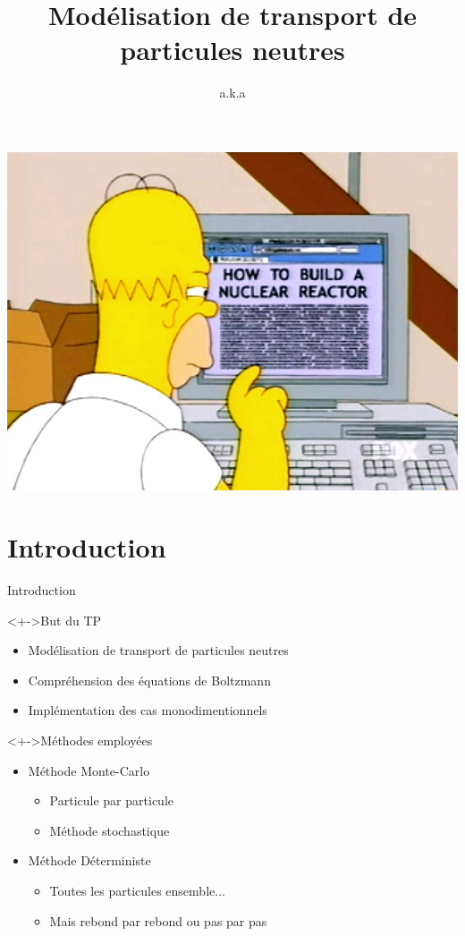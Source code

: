 \documentclass[17pt]{beamer}
\title[Modélisation transport]{Modélisation de transport de particules neutres}
\author[Sohet \& Valade]{a.k.a}
\date{}
\newenvironment{blockitemize}[1]{
  \begin{block}<+->{#1}
    \begin{itemize}
    }{
    \end{itemize}
  \end{block}
}
\begin{document}
\begin{frame}
  \maketitle
  \centering
  \vspace{-40pt}
  \includegraphics[height=.55\textheight]{homer_simpson_reading_on_pc}
\end{frame}

\section{Introduction}
\begin{frame}{Introduction}
  \begin{blockitemize}{But du TP}
  \item Modélisation de transport de particules neutres
  \item Compréhension des équations de Boltzmann 
  \item Implémentation des cas monodimentionnels 
  \end{blockitemize}

  \begin{blockitemize}{Méthodes employées}
  \item Méthode Monte-Carlo
    \begin{itemize}
    \item Particule par particule
    \item Méthode stochastique
    \end{itemize}
  \item Méthode Déterministe
    \begin{itemize}
    \item Toutes les particules ensemble...
    \item Mais rebond par rebond ou pas par pas
    \end{itemize}
  \end{blockitemize}
\end{frame}
\end{document}
